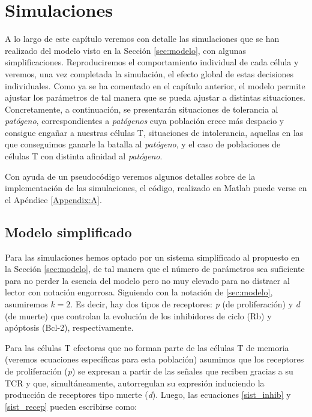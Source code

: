 
\chapter{Simulaciones}
\label{cap:simulaciones}

A lo largo de este capítulo veremos con detalle las simulaciones que se han realizado del modelo visto en la Sección \ref{sec:modelo}, con algunas simplificaciones. Reproduciremos el comportamiento individual de cada célula y veremos, una vez completada la simulación, el efecto global de estas decisiones individuales. Como ya se ha comentado en el capítulo anterior, el modelo permite ajustar los parámetros de tal manera que se pueda ajustar a distintas situaciones. Concretamente, a continuación, se presentarán situaciones de tolerancia al \textit{patógeno}, correspondientes a \textit{patógenos} cuya población crece más despacio y consigue engañar a nuestras células T, situaciones de intolerancia, aquellas en las que conseguimos ganarle la batalla al \textit{patógeno}, y el caso de poblaciones de células T con distinta afinidad al \textit{patógeno}.

Con ayuda de un pseudocódigo veremos algunos detalles sobre de la implementación de las simulaciones, el código, realizado en Matlab puede verse en el Apéndice \ref{Appendix:A}.


\section{Modelo simplificado}

Para las simulaciones hemos optado por un sistema simplificado al propuesto en la Sección \ref{sec:modelo}, de tal manera que el número de parámetros sea suficiente para no perder la esencia del modelo pero no muy elevado para no distraer al lector con notación engorrosa. Siguiendo con la notación de \ref{sec:modelo}, asumiremos $k=2$. Es decir, hay dos tipos de receptores: \textit{p} (de proliferación) y \textit{d} (de muerte) que controlan
la evolución de los inhibidores de ciclo (Rb) y apóptosis (Bcl-2), respectivamente.

Para las células T efectoras que no forman parte de las células T de memoria (veremos ecuaciones específicas para esta población) asumimos que los receptores de proliferación (\textit{p}) se expresan a partir de las señales que reciben gracias a su TCR y que, simultáneamente, autorregulan su expresión induciendo la producción de receptores tipo muerte (\textit{d}). Luego, las ecuaciones \ref{sist_inhib} y \ref{sist_recep} pueden escribirse como:

